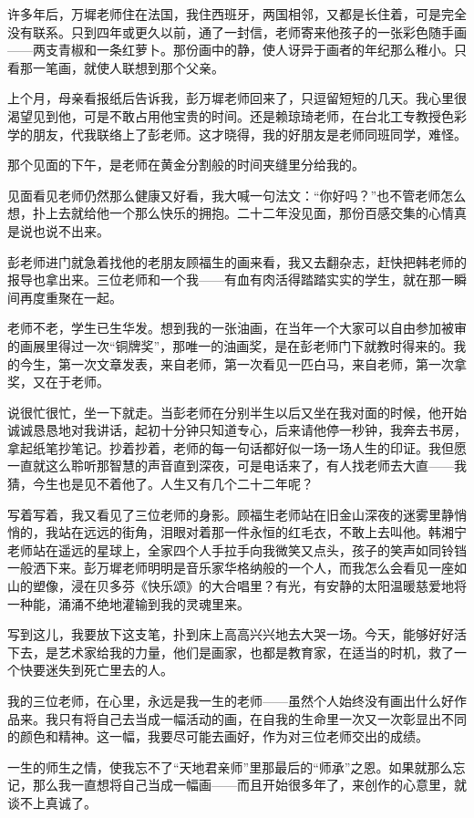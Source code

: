 \par 许多年后，万墀老师住在法国，我住西班牙，两国相邻，又都是长住着，可是完全没有联系。只到四年或更久以前，通了一封信，老师寄来他孩子的一张彩色随手画——两支青椒和一条红萝卜。那份画中的静，使人讶异于画者的年纪那么稚小。只看那一笔画，就使人联想到那个父亲。
\par 上个月，母亲看报纸后告诉我，彭万墀老师回来了，只逗留短短的几天。我心里很渴望见到他，可是不敢占用他宝贵的时间。还是赖琼琦老师，在台北工专教授色彩学的朋友，代我联络上了彭老师。这才晓得，我的好朋友是老师同班同学，难怪。
\par 那个见面的下午，是老师在黄金分割般的时间夹缝里分给我的。
\par 见面看见老师仍然那么健康又好看，我大喊一句法文：“你好吗？”也不管老师怎么想，扑上去就给他一个那么快乐的拥抱。二十二年没见面，那份百感交集的心情真是说也说不出来。
\par 彭老师进门就急着找他的老朋友顾福生的画来看，我又去翻杂志，赶快把韩老师的报导也拿出来。三位老师和一个我——有血有肉活得踏踏实实的学生，就在那一瞬间再度重聚在一起。
\par 老师不老，学生已生华发。想到我的一张油画，在当年一个大家可以自由参加被审的画展里得过一次“铜牌奖”，那唯一的油画奖，是在彭老师门下就教时得来的。我的今生，第一次文章发表，来自老师，第一次看见一匹白马，来自老师，第一次拿奖，又在于老师。
\par 说很忙很忙，坐一下就走。当彭老师在分别半生以后又坐在我对面的时候，他开始诚诚恳恳地对我讲话，起初十分钟只知道专心，后来请他停一秒钟，我奔去书房，拿起纸笔抄笔记。抄着抄着，老师的每一句话都好似一场一场人生的印证。我但愿一直就这么聆听那智慧的声音直到深夜，可是电话来了，有人找老师去大直——我猜，今生也是见不着他了。人生又有几个二十二年呢？
\par 写着写着，我又看见了三位老师的身影。顾福生老师站在旧金山深夜的迷雾里静悄悄的，我站在远远的街角，泪眼对着那一件永恒的红毛衣，不敢上去叫他。韩湘宁老师站在遥远的星球上，全家四个人手拉手向我微笑又点头，孩子的笑声如同铃铛一般洒下来。彭万墀老师明明是音乐家华格纳般的一个人，而我怎么会看见一座如山的塑像，浸在贝多芬《快乐颂》的大合唱里？有光，有安静的太阳温暖慈爱地将一种能，涌涌不绝地灌输到我的灵魂里来。
\par 写到这儿，我要放下这支笔，扑到床上高高兴兴地去大哭一场。今天，能够好好活下去，是艺术家给我的力量，他们是画家，也都是教育家，在适当的时机，救了一个快要迷失到死亡里去的人。
\par 我的三位老师，在心里，永远是我一生的老师——虽然个人始终没有画出什么好作品来。我只有将自己去当成一幅活动的画，在自我的生命里一次又一次彰显出不同的颜色和精神。这一幅，我要尽可能去画好，作为对三位老师交出的成绩。
\par 一生的师生之情，使我忘不了“天地君亲师”里那最后的“师承”之恩。如果就那么忘记，那么我一直想将自己当成一幅画——而且开始很多年了，来创作的心意里，就谈不上真诚了。




